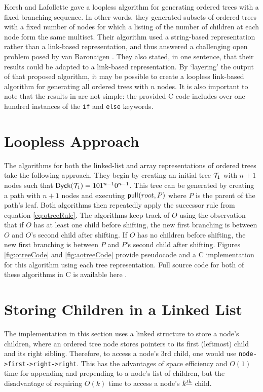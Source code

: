 Korsh and Lafollette \cite{korsh2000multiset} gave a loopless algorithm for generating ordered trees with a fixed branching sequence.  In other words, they generated subsets of ordered trees with a fixed number of nodes for which a listing of the number of children at each node form the same multiset.  Their algorithm used a string-based representation rather than a link-based representation, and thus answered a challenging open problem posed by van Baronaigen \cite{van1991loopless}.   They also stated, in one sentence, that their results could be adapted to a link-based representation.  By `layering' the output of that proposed algorithm, it may be possible to create a loopless link-based algorithm for generating all ordered trees with $n$ nodes.  It is also important to note that the results in \cite{korsh2000multiset} are not simple: the provided C code includes over one hundred instances of the \verb$if$ and \verb$else$ keywords.

\section{Loopless Approach}\label{sec:looples-approach}
The algorithms for both the linked-list and array representations of ordered trees take the following approach.  They begin by creating an initial tree $\mathcal{T}_1$ with $n+1$ nodes such that $\mathsf{Dyck}{(\mathcal{T}_1)}=101^{n-1}0^{n-1}$.  This tree can be generated by creating a path with $n+1$ nodes and executing $\mathsf{pull}_{}(root,P)$ where $P$ is the parent of the path's leaf. Both algorithms then repeatedly apply the successor rule from equation \ref{eq:otreeRule}.  The algorithms keep track of $O$ using the observation that if $O$ has at least one child before shifting, the new first branching is between $O$ and $O$'s second child after shifting.  If $O$ has no children before shifting, the new first branching is between $P$ and $P$'s second child after shifting. Figures \ref{fig:otreeCode} and \ref{fig:aotreeCode} provide pseudocode and a C implementation for this algorithm using each tree representation.  Full source code for both of these algorithms in C is available here \cite{lapeythesisrepo}.


\section{Storing Children in a Linked List}\label{sec:otree-link}

The implementation in this section uses a linked structure to store a node's children, where an ordered tree node stores pointers to its first (leftmost) child and its right sibling.  Therefore, to access a node's 3rd child, one would use \verb+node->first->right->right+.
This has the advantages of space efficiency and $O(1)$ time for appending and prepending to a node's list of children, but the disadvantage of requiring $O(k)$ time to access a node's $k^{\underline{th}}$ child. 

